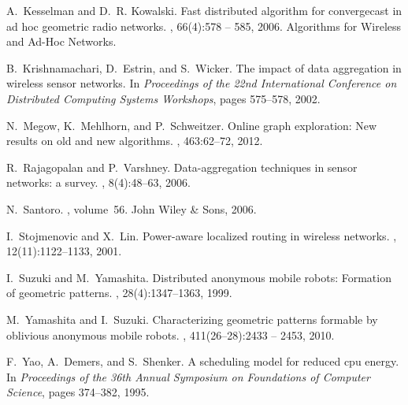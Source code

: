 \documentclass{article}
\begin{document}
\begin{thebibliography}{10}
A.~Kesselman and D.~R. Kowalski.
\newblock Fast distributed algorithm for convergecast in ad hoc geometric radio
  networks.
, 66(4):578 --
  585, 2006.
\newblock Algorithms for Wireless and Ad-Hoc Networks.

B.~Krishnamachari, D.~Estrin, and S.~Wicker.
\newblock The impact of data aggregation in wireless sensor networks.
\newblock In {\em Proceedings of the 22nd International Conference on Distributed Computing Systems Workshops}, pages 575--578, 2002.

N.~Megow, K.~Mehlhorn, and P.~Schweitzer.
\newblock Online graph exploration: New results on old and new algorithms.
, 463:62--72, 2012.

R.~Rajagopalan and P.~Varshney.
\newblock Data-aggregation techniques in sensor networks: a survey.
, 8(4):48--63, 2006.

N.~Santoro.
, volume~56.
\newblock John Wiley \& Sons, 2006.

I.~Stojmenovic and X.~Lin.
\newblock Power-aware localized routing in wireless networks.
,
  12(11):1122--1133, 2001.

I.~Suzuki and M.~Yamashita.
\newblock Distributed anonymous mobile robots: Formation of geometric patterns.
, 28(4):1347--1363, 1999.

M.~Yamashita and I.~Suzuki.
\newblock Characterizing geometric patterns formable by oblivious anonymous
  mobile robots.
, 411(26–28):2433 -- 2453, 2010.

F.~Yao, A.~Demers, and S.~Shenker.
\newblock A scheduling model for reduced cpu energy.
\newblock In {\em Proceedings of the 36th Annual Symposium on Foundations of Computer Science}, pages 374--382, 1995.

\end{thebibliography}
\end{document}
